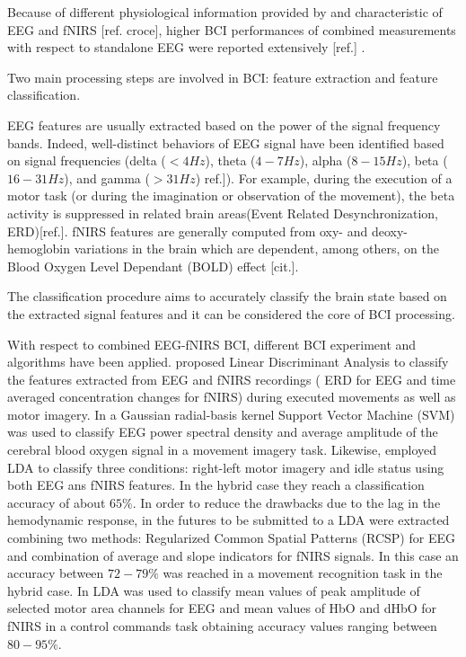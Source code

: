 \documentclass[12pt ]{iopart}
\begin{document}
Because of different physiological information provided by and characteristic of EEG and fNIRS [ref. croce], higher BCI performances  of combined measurements with respect to standalone EEG were reported extensively [ref.] .

Two main processing steps are involved in BCI:  feature extraction and feature classification. 

EEG features are usually extracted based on the power of the signal frequency bands. Indeed, well-distinct behaviors of EEG signal have been identified based on signal frequencies (delta ($< 4 Hz$), theta ($4-7 Hz$), alpha ($8-15 Hz$), beta ($16-31 Hz$), and gamma ($> 31 Hz$) ref.]). For example, during the execution of a motor task (or during the imagination or observation of the movement), the beta activity is suppressed in related brain areas(Event Related Desynchronization, ERD)[ref.].  
fNIRS  features are generally  computed from  oxy- and deoxy-hemoglobin variations in the brain which are dependent, among others, on the  Blood Oxygen Level Dependant (BOLD) effect [cit.]. 

The classification procedure aims to accurately classify the brain state  based on the extracted signal features  and it can be considered the core of BCI processing.


With respect to combined EEG-fNIRS BCI, different BCI experiment and algorithms have been applied. \textcite{Fazli_2012} proposed Linear Discriminant Analysis to classify the features extracted from EEG and fNIRS recordings ( ERD for EEG and time averaged concentration changes for fNIRS) during executed movements as well as motor imagery.  In \textcite{ma2012hybrid} a Gaussian radial-basis kernel Support Vector Machine (SVM) was used to classify EEG power spectral density and average amplitude of the cerebral blood oxygen signal in a movement imagery task.  Likewise,  \textcite{lee2014hybrid} employed LDA to classify three conditions: right-left motor imagery and idle status using both EEG ans fNIRS features. In the hybrid case they reach a classification accuracy of about $65\%$. In order to reduce the drawbacks due to the lag in the hemodynamic response, in  \textcite{buccino2016hybrid} the futures to be submitted to a LDA were extracted combining two methods: Regularized Common Spatial Patterns (RCSP) for EEG and combination of average and slope indicators for fNIRS signals. In this case an accuracy between $72-79\%$ was reached in a movement recognition task in the hybrid case. In  \textcite{khan2014decoding, khan2017hybrid} LDA was used to classify mean values of peak amplitude of selected motor area channels for EEG and mean values of HbO and dHbO for fNIRS in a control commands task obtaining accuracy values ranging between $80-95\%$. 
\end{document}
